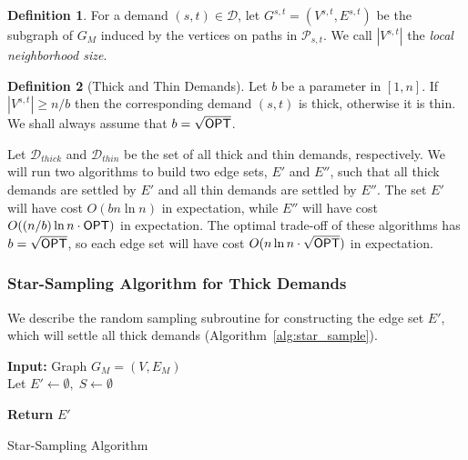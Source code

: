 \documentclass{article}
\theoremstyle{definition}
\newtheorem{definition}{Definition}
\theoremstyle{remark}
\def\opt {{\sf OPT}}
\begin{document}
\begin{definition}
    For a demand $(s,t) \in \mathcal{D}$, let $G^{s,t} = (V^{s,t}, E^{s,t})$ be the subgraph of $G_M$ induced by the vertices on paths in $\mathcal{P}_{s,t}$. We call $|V^{s,t}|$ the \textit{local neighborhood size}.
\end{definition}

\begin{definition}[Thick and Thin Demands] 
    Let $b$ be a parameter in $[1,n]$. If $|V^{s,t}| \geq n/b$ then the corresponding demand $(s,t)$ is thick, otherwise it is thin. We shall always assume that $b = \sqrt{{\opt}}$.
\end{definition}

Let $\mathcal{D}_{thick}$ and $\mathcal{D}_{thin}$ be the set of all thick and thin demands, respectively. We will run two algorithms to build two edge sets, $E'$ and $E''$, such that all thick demands are settled by $E'$ and all thin demands are settled by $E''$. The set $E'$ will have cost $O(bn\ln{n})$ in expectation, while $E''$ will have cost $O((n/b)\ln{n} \cdot {\opt})$ in expectation. The optimal trade-off of these algorithms has $b = \sqrt{\opt}$, so each edge set will have cost $O(n\ln{n} \cdot \sqrt{{\opt} })$ in expectation.

\subsubsection{Star-Sampling Algorithm for Thick Demands} \label{sec:thick}
We describe the random sampling subroutine for constructing the edge set $E'$, which will settle all thick demands (Algorithm~\ref{alg:star_sample}). 

\begin{algorithm}[h]
\DontPrintSemicolon

\textbf{Input:} 
Graph $G_M = (V, E_M)$ \\

Let $E' \gets \emptyset, \; S \gets \emptyset$  

\textbf{Return} $E'$ \;

\caption{\label{alg:star_sample} Star-Sampling Algorithm}
\end{algorithm}
\end{document}
